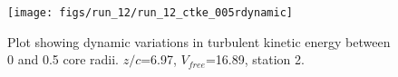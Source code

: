 \begin{figure}[H]
\centering
\texttt{[image: figs/run\_12/run\_12\_ctke\_005rdynamic]}
\caption{Plot showing dynamic variations in turbulent kinetic energy between 0 and 0.5 core radii. $z/c$=6.97, $V_{free}$=16.89, station 2.}
\label{fig:run_12_ctke_005rdynamic}
\end{figure}


